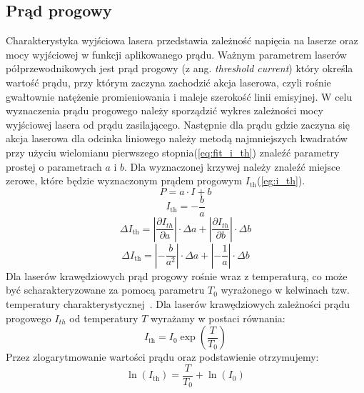 \subsection{Prąd progowy}
Charakterystyka wyjściowa lasera przedstawia zależność napięcia na laserze oraz mocy wyjściowej w funkcji aplikowanego prądu.
Ważnym parametrem laserów półprzewodnikowych jest prąd progowy (z ang. \textit{threshold
current}) który określa wartość prądu, przy którym zaczyna zachodzić akcja laserowa, czyli
rośnie gwałtownie natężenie promieniowania i maleje szerokość linii emisyjnej. W celu wyznaczenia prądu progowego należy
sporządzić wykres zależności mocy wyjściowej lasera od prądu zasilającego. Następnie dla prądu gdzie zaczyna się akcja
laserowa dla odcinka liniowego należy metodą najmniejszych kwadratów przy użyciu wielomianu pierwszego stopnia(\ref{eq:fit_i_th})
znaleźć parametry prostej o parametrach $a$ i $b$.
Dla wyznaczonej krzywej należy znaleźć miejsce zerowe, które będzie wyznaczonym prądem progowym $I_{\mathrm{th}}$(\ref{eg:i_th}).
\begin{equation}
\label{eq:fit_i_th}
P = a \cdot I + b
\end{equation}
\begin{equation}
\label{eg:i_th}
I_{\mathrm{th}} = -\frac{b}{a}
\end{equation}
\begin{equation}
\Delta I_{\mathrm{th}} = \left\lvert \frac{\partial I_{th}}{\partial a} \right\rvert \cdot \Delta a + \left\lvert \frac{\partial I_{th}}{\partial b} \right\rvert \cdot \Delta b
\end{equation}
\begin{equation}
\Delta I_{\mathrm{th}} = \left\lvert -\frac{b}{a^2} \right\rvert \cdot \Delta a + \left\lvert -\frac{1}{a} \right\rvert \cdot \Delta b
\end{equation}
Dla laserów krawędziowych prąd progowy rośnie wraz z temperaturą, co może być scharakteryzowane za pomocą parametru
$T_{0}$ wyrażonego w kelwinach tzw. temperatury charakterystycznej~\cite{opto_book}.
Dla laserów krawędziowych zależności prądu progowego $I_{th}$ od temperatury $T$ wyrażamy w postaci równania:
\begin{equation}
\label{eq:i_th}
I_{\mathrm{th}} = I_0 \exp \left( \frac{T}{T_0} \right)
\end{equation}
Przez zlogarytmowanie wartości prądu oraz podstawienie otrzymujemy:
\begin{equation}
\ln(I_{\mathrm{th}}) =    \frac{T}{T_0}  + \ln(I_0)
\end{equation}
